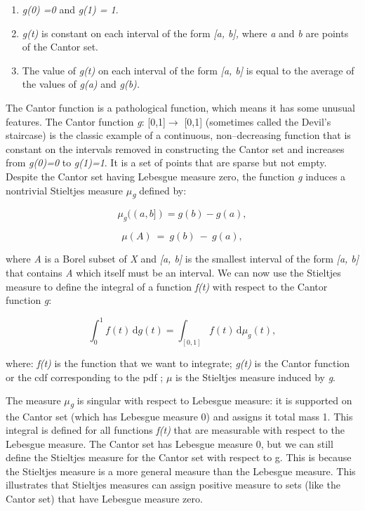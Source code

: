 \documentclass[12pt,a4paper]{report}
\numberwithin{equation}{section}
\begin{document}
\begin{enumerate}
\def\labelenumi{\roman{enumi}.}
\item
  \emph{g(0) =0} and \emph{g(1) = 1}.
\item
  \emph{g(t)} is constant on each interval of the form \emph{{[}a,
  b{]},} where \emph{a} and \emph{b} are points of the Cantor set.
\item
  The value of \emph{g(t)} on each interval of the form \emph{{[}a,
  b{]}} is equal to the average of the values of \emph{g(a)} and
  \emph{g(b).}
\end{enumerate}

The Cantor function is a pathological function, which means it has some
unusual features. The Cantor function \emph{g}: {[}0,1{]}$\rightarrow$ {[}0,1{]}
(sometimes called the Devil's staircase) is the classic example of a
continuous, non--decreasing function that is constant on the intervals
removed in constructing the Cantor set and increases from \emph{g(0)=0}
to \emph{g(1)=1}. It is a set of points that are sparse but not empty.
Despite the Cantor set having Lebesgue measure zero, the function
\emph{g} induces a nontrivial Stieltjes measure
\emph{$\mu$\textsubscript{g}} defined by:

\[\mu_{g}((a,b\rbrack) = g(b) - g(a),\]

\[\mu(A)\  = \ g(b)\  - \ g(a),\]

where \emph{A} is a Borel subset of \emph{X} and \emph{{[}a, b{]}} is
the smallest interval of the form \emph{{[}a, b{]}} that contains
\emph{A} which itself must be an interval. We can now use the Stieltjes
measure to define the integral of a function \emph{f(t)} with respect to
the Cantor function \emph{g}:

\[
\int_{0}^{1} f(t)\,\mathrm{d}g(t)
= \int_{[0,1]} f(t)\,\mathrm{d}\mu_{g}(t),
\]


where: \emph{f(t)} is the function that we want to integrate;
\emph{g(t)} is the Cantor function or the cdf corresponding to the pdf ;
\emph{$\mu$} is the Stieltjes measure induced by \emph{g}.


The measure \emph{$\mu$\textsubscript{g}}\hspace{0pt} is singular with
respect to Lebesgue measure: it is supported on the Cantor set (which
has Lebesgue measure 0) and assigns it total mass 1. This integral is
defined for all functions \emph{f(t)} that are measurable with respect
to the Lebesgue measure. The Cantor set has Lebesgue measure 0, but we can still define the
Stieltjes measure for the Cantor set with respect to g. This is because the Stieltjes measure is a more
general measure than the Lebesgue measure. This illustrates that
Stieltjes measures can assign positive measure to sets (like the Cantor
set) that have Lebesgue measure zero.
\end{document}
